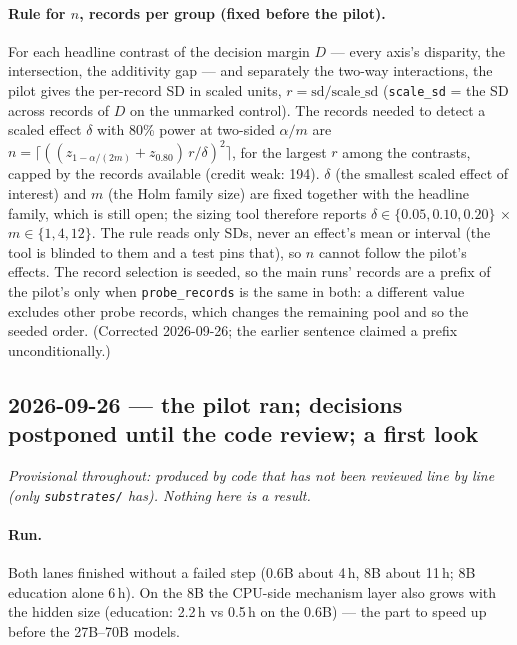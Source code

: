 \documentclass{article}
\begin{document}
\paragraph{Rule for $n$, records per group (fixed before the pilot).} For each headline contrast of the decision
margin $D$ --- every axis's disparity, the intersection, the additivity gap --- and separately the two-way
interactions, the pilot gives the per-record SD in scaled units, $r = \mathrm{sd}/\mathrm{scale\_sd}$
(\texttt{scale\_sd} = the SD across records of $D$ on the unmarked control). The records needed to detect a scaled
effect $\delta$ with 80\% power at two-sided $\alpha/m$ are
$n = \lceil ((z_{1-\alpha/(2m)} + z_{0.80})\, r/\delta)^2 \rceil$, for the largest $r$ among the contrasts, capped
by the records available (credit weak: 194). $\delta$ (the smallest scaled effect of interest) and $m$ (the Holm
family size) are fixed together with the headline family, which is still open; the sizing tool therefore reports
$\delta \in \{0.05, 0.10, 0.20\}$ $\times$ $m \in \{1, 4, 12\}$. The rule reads only SDs, never an effect's mean
or interval (the tool is blinded to them and a test pins that), so $n$ cannot follow the pilot's effects. The record selection
is seeded, so the main runs' records are a prefix of the pilot's only when \texttt{probe\_records} is the same in
both: a different value excludes other probe records, which changes the remaining pool and so the seeded order.
(Corrected 2026-09-26; the earlier sentence claimed a prefix unconditionally.)

\subsection*{2026-09-26 --- the pilot ran; decisions postponed until the code review; a first look}
\emph{Provisional throughout: produced by code that has not been reviewed line by line (only \texttt{substrates/}
has). Nothing here is a result.}

\paragraph{Run.} Both lanes finished without a failed step (0.6B about 4\,h, 8B about 11\,h; 8B education alone
6\,h). On the 8B the CPU-side mechanism layer also grows with the hidden size (education: 2.2\,h vs 0.5\,h on the
0.6B) --- the part to speed up before the 27B--70B models.
\end{document}
